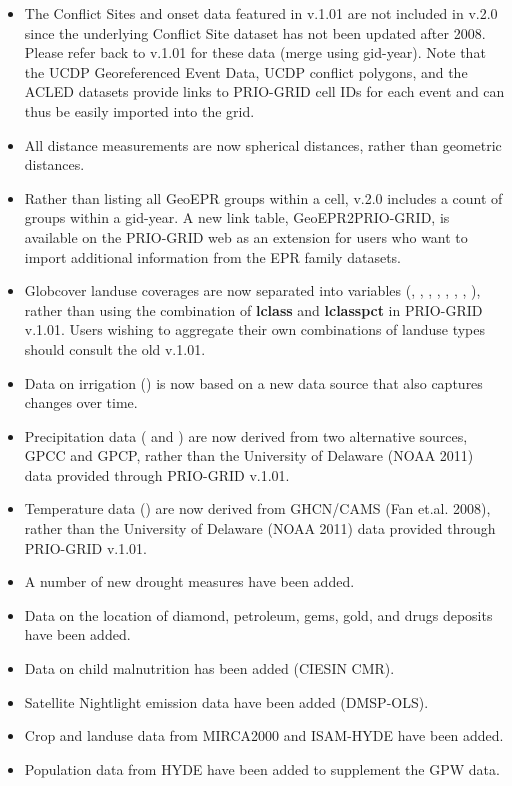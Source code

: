 \documentclass[]{book}
\begin{document}
\begin{itemize}
  \begin{itemize}
  \itemsep1pt\parskip0pt
  \item
    The Conflict Sites and onset data featured in v.1.01 are not
    included in v.2.0 since the underlying Conflict Site dataset has not
    been updated after 2008. Please refer back to v.1.01 for these data
    (merge using gid-year). Note that the UCDP Georeferenced Event Data,
    UCDP conflict polygons, and the ACLED datasets provide links to
    PRIO-GRID cell IDs for each event and can thus be easily imported
    into the grid.
  \item
    All distance measurements are now spherical distances, rather than
    geometric distances.
  \item
    Rather than listing all GeoEPR groups within a cell, v.2.0 includes
    a count of  groups within a gid-year. A new link
    table, GeoEPR2PRIO-GRID, is available on the PRIO-GRID web as an
    extension for users who want to import additional information from
    the EPR family datasets.
  \item
    Globcover landuse coverages are now separated into variables
    (, , ,
    , , ,
    , ), rather than using the
    combination of \textbf{lclass} and \textbf{lclasspct} in PRIO-GRID
    v.1.01. Users wishing to aggregate their own combinations of landuse
    types should consult the old v.1.01.
  \item
    Data on irrigation () is now based on a new data
    source that also captures changes over time.
  \item
    Precipitation data ( and ) are
    now derived from two alternative sources, GPCC and GPCP, rather than
    the University of Delaware (NOAA 2011) data provided through
    PRIO-GRID v.1.01.
  \item
    Temperature data () are now derived from GHCN/CAMS (Fan
    et.al. 2008), rather than the University of Delaware (NOAA 2011)
    data provided through PRIO-GRID v.1.01.
  \item
    A number of new drought measures have been added.
  \item
    Data on the location of diamond, petroleum, gems, gold, and drugs
    deposits have been added.
  \item
    Data on child malnutrition has been added (CIESIN CMR).
  \item
    Satellite Nightlight emission data have been added (DMSP-OLS).
  \item
    Crop and landuse data from MIRCA2000 and ISAM-HYDE have been added.
  \item
    Population data from HYDE have been added to supplement the GPW
    data.
  \end{itemize}
\end{itemize}
\end{document}
